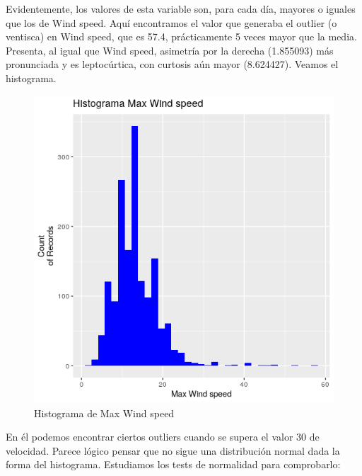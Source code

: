 Evidentemente, los valores de esta variable son, para cada día, mayores o iguales que los de Wind speed. Aquí encontramos el valor que generaba el outlier (o ventisca) en Wind speed, que es 57.4, prácticamente 5 veces mayor que la media. Presenta, al igual que Wind speed, asimetría por la derecha (1.855093) más pronunciada y es leptocúrtica, con curtosis aún mayor (8.624427). Veamos el histograma.

\begin{figure}[H] %
	\centering
	\includegraphics[scale=0.7]{hist-mws.png}  %
	\caption{Histograma de Max Wind speed} 
	\label{fig:hist-mws}
\end{figure}

En él podemos encontrar ciertos outliers cuando se supera el valor 30 de velocidad. Parece lógico pensar que no sigue una distribución normal dada la forma del histograma. Estudiamos los tests de normalidad para comprobarlo:

